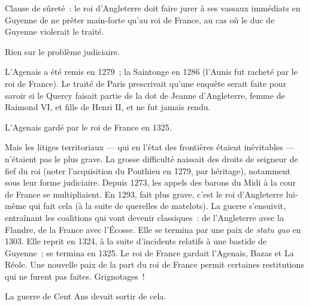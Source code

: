 \documentclass[french,twoside]{book} %
\begin{document}
\begin{listalpha}[itemsep=0pt,]
\item Clause de sûreté : le roi d’Angleterre doit faire jurer à ses vassaux immédiats en Guyenne de ne prêter main-forte qu’au roi de France, au cas où le duc de Guyenne violerait le traité.
\item Rien sur le problème judiciaire.
\item L’Agenais a été remis en 1279 ; la Saintonge en 1286 (l’Aunis fut racheté par le roi de France). Le traité de Paris prescrivait qu’une enquête serait faite pour savoir si le Quercy faisait partie de la dot de Jeanne d’Angleterre, femme de Raimond VI, et fille de Henri II, et ne fut jamais rendu.
\item L’Agenais gardé par le roi de France en 1325.
\end{listalpha}

\noindent Mais les litiges territoriaux — qui en l’état des frontières étaient inévitables — n’étaient pas le plus grave. La grosse difficulté naissait des droits de seigneur de fief du roi (noter l’acquisition du Ponthieu en 1279, par héritage), notamment sous leur forme judiciaire. Depuis 1273, les appels des barons du Midi à la cour de France se multipliaient. En 1293, fait plus grave, c’est le roi d’Angleterre lui-même qui fait cela (à la suite de querelles de matelots). La guerre s’ensuivit, entraînant les coalitions qui vont devenir classiques : de l’Angleterre avec la Flandre, de la France avec l’Écosse. Elle se termina par une paix de {\itshape statu quo} en 1303. Elle reprit en 1324, à la suite d’incidents relatifs à une bastide de Guyenne ; se termina en 1325. Le roi de France gardait l’Agenais, Bazas et La Réole. Une nouvelle paix de la part du roi de France permit certaines restitutions qui ne furent pas faites. Grignotages ! \par
La guerre de Cent Ans devait sortir de cela.
\end{document}
